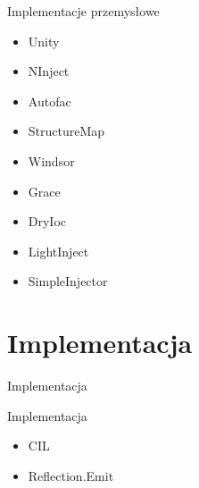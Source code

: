 \documentclass{beamer}
\begin{document}
\begin{frame}{Implementacje przemysłowe}
\begin{itemize}
	\item Unity
	\item NInject
	\item Autofac
	\item StructureMap
	\item Windsor
	\item Grace
	\item DryIoc
	\item LightInject
	\item SimpleInjector
\end{itemize}
\end{frame}



\section{Implementacja}

\begin{frame}{}
\begin{center}
\huge{Implementacja}
\end{center}
\end{frame}

\begin{frame}{Implementacja}
\begin{itemize}
	\item CIL
	\item Reflection.Emit
\end{itemize}
\end{frame}
\end{document}
